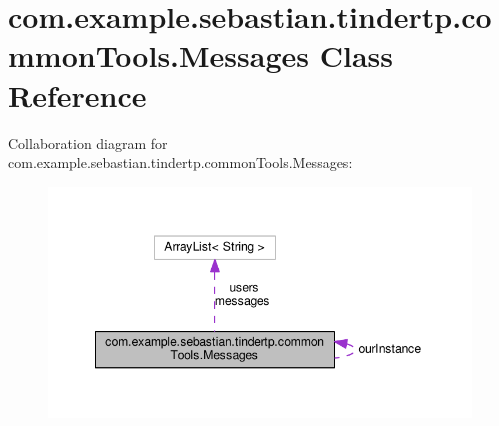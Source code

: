 \hypertarget{classcom_1_1example_1_1sebastian_1_1tindertp_1_1commonTools_1_1Messages}{}\section{com.\+example.\+sebastian.\+tindertp.\+common\+Tools.\+Messages Class Reference}
\label{classcom_1_1example_1_1sebastian_1_1tindertp_1_1commonTools_1_1Messages}


Collaboration diagram for com.\+example.\+sebastian.\+tindertp.\+common\+Tools.\+Messages\+:
\nopagebreak
\begin{figure}[H]
\begin{center}
\leavevmode
\includegraphics[width=348pt]{classcom_1_1example_1_1sebastian_1_1tindertp_1_1commonTools_1_1Messages__coll__graph}
\end{center}
\end{figure}
